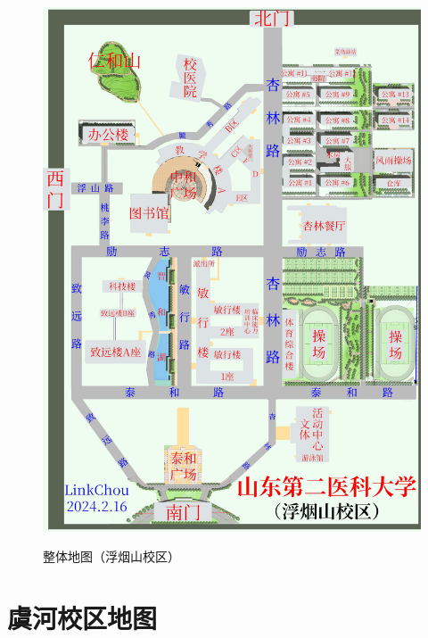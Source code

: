 \newpage
\noindent\begin{figure}[H]
    \centering
    \caption[map_all]{整体地图（浮烟山校区）}
    \vspace{1em}
    \noindent\includegraphics*[width=.99\linewidth]{浮烟山校区整体地图.pdf}
    \label{map_a}
\end{figure}

\newpage
\noindent\section[虞河校区地图]{虞河校区地图}


